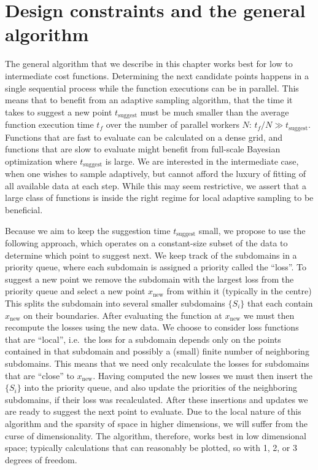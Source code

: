 \hypertarget{sec:design}{%
\section{Design constraints and the general algorithm}\label{sec:design}}


The general algorithm that we describe in this chapter works best for low to intermediate cost functions.
Determining the next candidate points happens in a single sequential process while the function executions can be in parallel.
This means that to benefit from an adaptive sampling algorithm, that the time it takes to suggest a new point $t_\textrm{suggest}$ must be much smaller than the average function execution time $t_f$ over the number of parallel workers $N$: $t_f / N \gg t_\textrm{suggest}$.
Functions that are fast to evaluate can be calculated on a dense grid, and functions that are slow to evaluate might benefit from full-scale Bayesian optimization where $t_\textrm{suggest}$ is large.
We are interested in the intermediate case, when one wishes to sample adaptively, but cannot afford the luxury of fitting of all available data at each step.
While this may seem restrictive, we assert that a large class of functions is inside the right regime for local adaptive sampling to be beneficial.


Because we aim to keep the suggestion time $t_\textrm{suggest}$ small, we propose to use the following approach, which operates on a constant-size subset of the data to determine which point to suggest next.
We keep track of the subdomains in a priority queue, where each subdomain is assigned a priority called the ``loss''.
To suggest a new point we remove the subdomain with the largest loss from the priority queue and select a new point $x_\textrm{new}$ from within it (typically in the centre)
This splits the subdomain into several smaller subdomains $\{S_i\}$ that each contain $x_\textrm{new}$ on their boundaries.
After evaluating the function at $x_\textrm{new}$ we must then recompute the losses using the new data.
We choose to consider loss functions that are ``local'', i.e.~the loss for a subdomain depends only on the points contained in that subdomain and possibly a (small) finite number of neighboring subdomains.
This means that we need only recalculate the losses for subdomains that are ``close'' to $x_\textrm{new}$.
Having computed the new losses we must then insert the $\{S_i\}$ into the priority queue, and also update the priorities of the neighboring subdomains, if their loss was recalculated.
After these insertions and updates we are ready to suggest the next point to evaluate.
Due to the local nature of this algorithm and the sparsity of space in higher dimensions, we will suffer from the curse of dimensionality.
The algorithm, therefore, works best in low dimensional space; typically calculations that can reasonably be plotted, so with 1, 2, or 3 degrees of freedom.

